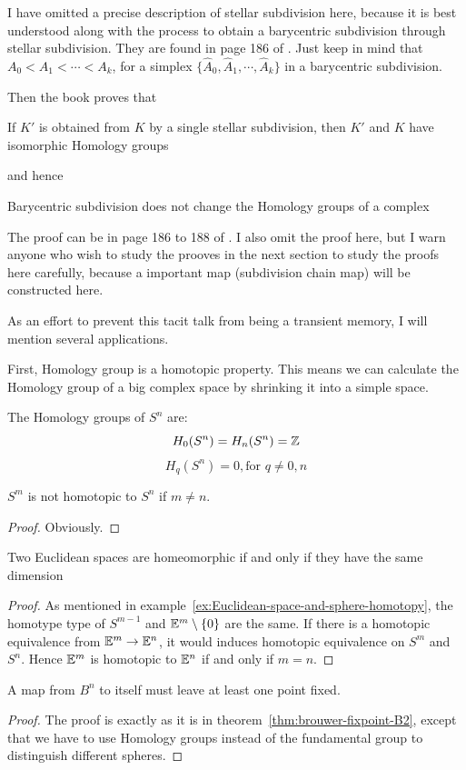 I have omitted a precise description of stellar subdivision here,
because it is best understood along with the process to obtain a
barycentric subdivision through stellar subdivision. They are found in
page 186 of \cite{book}. Just keep in mind that $A_0<A_1<\cdots<A_k$,
for a simplex $\{\hat{A}_0,\hat{A}_1,\cdots,\hat{A}_k\}$ in a
barycentric subdivision.

Then the book proves that
\begin{thm}
    If $K'$ is obtained from $K$ by a single stellar subdivision, then
    $K'$ and $K$ have isomorphic Homology groups
\end{thm}
and hence
\begin{coro}
    Barycentric subdivision does not change the Homology groups of a
    complex
\end{coro}

The proof can be in page 186 to 188 of \cite{book}. I also omit the
proof here, but I warn anyone who wish to study the prooves in the
next section to study the proofs here carefully, because a important
map (subdivision chain map) will be constructed here.

As an effort to prevent this tacit talk from being a transient memory,
I will mention several applications.

\begin{remark}
    First, Homology group is a homotopic property. This means we can
    calculate the Homology group of a big complex space by shrinking
    it into a simple space.
\end{remark}

\begin{key}
    The Homology groups of $S^n$ are:
    $$ H_0(S^n)=H_n(S^n)=\mathbb{Z} $$
    $$ H_q(S^n)=0,\text{for $q\neq 0,n$} $$
\end{key}
\begin{thm}
    $S^m$ is not homotopic to $S^n$ if $m\neq n$.
\end{thm}
\begin{proof}
    Obviously.
\end{proof}

\begin{thm}
    Two Euclidean spaces are homeomorphic if and only if they have the
    same dimension
\end{thm}
\begin{proof}
    As mentioned in
    example~\ref{ex:Euclidean-space-and-sphere-homotopy}, the 
    homotype type of $S^{m-1}$ and $\mathbb{E}^{m}\setminus\{0\}$ are the
    same. If there is a homotopic equivalence from $\mathbb{E}^m\to \mathbb{E}^n$, it
    would induces homotopic equivalence on $S^m$ and $S^n$. Hence
    $\mathbb{E}^m$ is homotopic to $\mathbb{E}^n$ if and only if $m=n$.
\end{proof}

\begin{thm}
    A map from $B^n$ to itself must leave at least one point fixed.
\end{thm}
\begin{proof}
    The proof is exactly as it is in
    theorem~\ref{thm:brouwer-fixpoint-B2}, except that we have to use
    Homology groups instead of the fundamental group to distinguish
    different spheres.
\end{proof}

